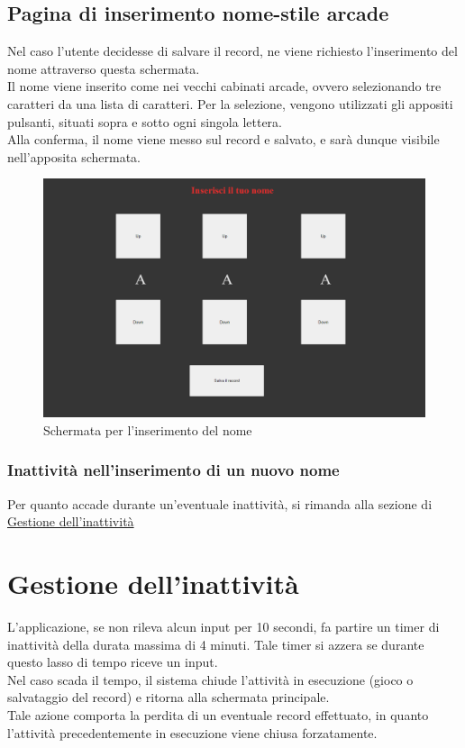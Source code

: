\subsection{Pagina di inserimento nome-stile arcade}
Nel caso l'utente decidesse di salvare il record, ne viene richiesto l'inserimento del nome attraverso questa schermata.\\
Il nome viene inserito come nei vecchi cabinati arcade, ovvero selezionando tre caratteri da una lista di caratteri. Per la selezione, vengono utilizzati gli appositi pulsanti, situati sopra e sotto ogni singola lettera.\\
Alla conferma, il nome viene messo sul record e salvato, e sarà dunque visibile nell'apposita schermata.
\begin{figure}[h]
    \centering
    \includegraphics[width=340pt]{schermataInserimentoNome.png}
    \caption{Schermata per l'inserimento del nome}
    \label{fig:schermataInserimentoNome}
\end{figure}
\subsubsection{Inattività nell'inserimento di un nuovo nome}
Per quanto accade durante un'eventuale inattività, si rimanda alla sezione di \hyperref[sec:inactivity]{Gestione dell'inattività}
\newpage
\section{Gestione dell'inattività}
\label{sec:inactivity}
L'applicazione, se non rileva alcun input per 10 secondi, fa partire un timer di inattività della durata massima di 4 minuti. Tale timer si azzera se durante questo lasso di tempo riceve un input.\\
Nel caso scada il tempo, il sistema chiude l'attività in esecuzione (gioco o salvataggio del record) e ritorna alla schermata principale.\\
Tale azione comporta la perdita di un eventuale record effettuato, in quanto l'attività precedentemente in esecuzione viene chiusa forzatamente.